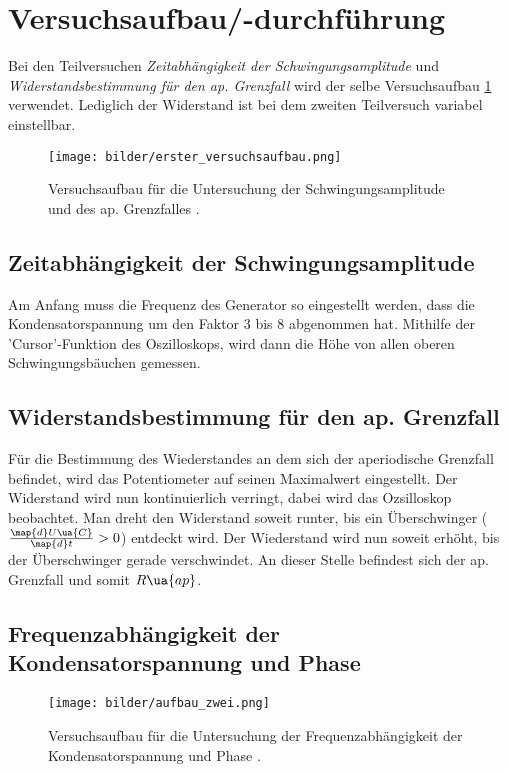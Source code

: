 \section{Versuchsaufbau/-durchführung}

Bei den Teilversuchen \emph{Zeitabhängigkeit der Schwingungsamplitude}
und \emph{Widerstandsbestimmung für den ap. Grenzfall} wird der selbe
Versuchsaufbau \ref{fig:aufbau_eins} verwendet. Lediglich der Widerstand ist bei dem
zweiten Teilversuch variabel einstellbar.
\begin{figure}
  \centering
  \texttt{[image: bilder/erster\_versuchsaufbau.png]}
  \caption{Versuchsaufbau für die Untersuchung der Schwingungsamplitude und des ap. Grenzfalles \cite{anleitung354}. }
  \label{fig:aufbau_eins}
\end{figure}


\subsection{Zeitabhängigkeit der Schwingungsamplitude}

Am Anfang muss die Frequenz des Generator
so eingestellt werden, dass die Kondensatorspannung um den Faktor $3$ bis $8$
abgenommen hat. Mithilfe der 'Cursor'-Funktion des Oszilloskops, wird dann
die Höhe von allen oberen Schwingungsbäuchen gemessen.

\subsection{Widerstandsbestimmung für den ap. Grenzfall}

Für die Bestimmung des Wiederstandes an dem sich
der aperiodische Grenzfall befindet, wird das Potentiometer
auf seinen Maximalwert eingestellt.
Der Widerstand wird nun kontinuierlich verringt, dabei wird das
Ozsilloskop beobachtet. Man dreht den Widerstand soweit runter, bis
ein Überschwinger ($\frac{\map{d}U\ua{C}}{\map{d}t}>0$) entdeckt wird.
Der Wiederstand wird nun soweit erhöht, bis der Überschwinger gerade verschwindet.
An dieser Stelle befindest sich der ap. Grenzfall und somit $R\ua{ap}$.

\subsection{Frequenzabhängigkeit der Kondensatorspannung und Phase}
\begin{figure}
  \centering
  \texttt{[image: bilder/aufbau\_zwei.png]}
  \caption{Versuchsaufbau für die Untersuchung der Frequenzabhängigkeit der Kondensatorspannung und Phase \cite{anleitung354}. }
  \label{fig:aufbau_zwei}
\end{figure}


